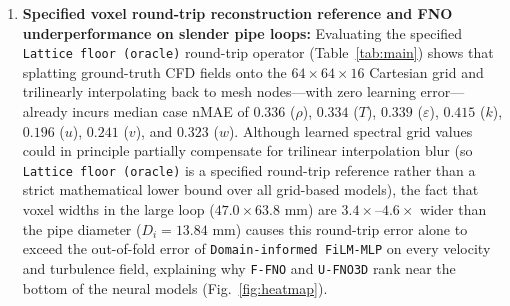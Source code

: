 \documentclass[11pt]{article}
\begin{document}
\begin{enumerate}
  \item \textbf{Specified voxel round-trip reconstruction reference and FNO underperformance on slender pipe loops:} Evaluating the specified \texttt{Lattice floor (oracle)} round-trip operator (Table~\ref{tab:main}) shows that splatting ground-truth CFD fields onto the $64\times 64\times 16$ Cartesian grid and trilinearly interpolating back to mesh nodes---with zero learning error---already incurs median case nMAE of $0.336$ ($\rho$), $0.334$ ($T$), $0.339$ ($\varepsilon$), $0.415$ ($k$), $0.196$ ($u$), $0.241$ ($v$), and $0.323$ ($w$). Although learned spectral grid values could in principle partially compensate for trilinear interpolation blur (so \texttt{Lattice floor (oracle)} is a specified round-trip reference rather than a strict mathematical lower bound over all grid-based models), the fact that voxel widths in the large loop ($47.0 \times 63.8\text{ mm}$) are $3.4\times\text{--}4.6\times$ wider than the pipe diameter ($D_i = 13.84\text{ mm}$) causes this round-trip error alone to exceed the out-of-fold error of \texttt{Domain-informed FiLM-MLP} on every velocity and turbulence field, explaining why \texttt{F-FNO} and \texttt{U-FNO3D} rank near the bottom of the neural models (Fig.~\ref{fig:heatmap}).
\end{enumerate}
\end{document}
